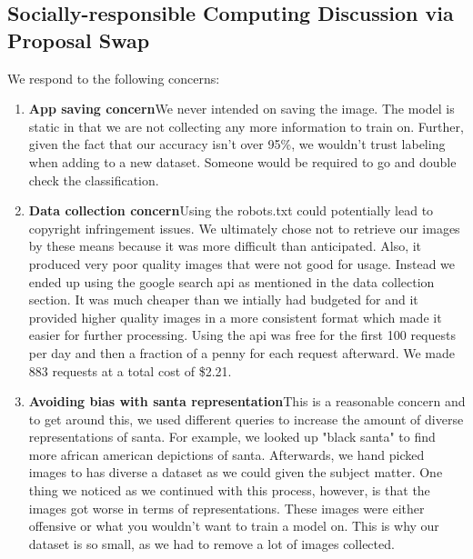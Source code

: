 \subsection{Socially-responsible Computing Discussion via Proposal Swap}

We respond to the following concerns:
\begin{enumerate}
    \item \textbf{App saving concern}\newline We never intended on saving the image. 
    The model is static in that we are not collecting any more information to train on. Further, given the fact 
    that our accuracy isn't over 95\%, we wouldn't trust labeling when adding to a new dataset. Someone would be 
    required to go and double check the classification. 
    \item \textbf{Data collection concern}\newline Using the robots.txt could potentially lead to copyright infringement 
    issues. We ultimately chose not to retrieve our images by these means because it was more difficult than anticipated. 
    Also, it produced very poor quality images that were not good for usage. Instead we ended up using the google search 
    api as mentioned in the data collection section. It was much cheaper than we intially had budgeted for and it provided 
    higher quality images in a more consistent format which made it easier for further processing. Using the api was free 
    for the first 100 requests per day and then a fraction of a penny for each request afterward. We made 883 requests at a 
    total cost of \$2.21.
    \item \textbf{Avoiding bias with santa representation}\newline This is a reasonable concern and to get around this, we used different 
    queries to increase the amount of diverse representations of santa. For example, we looked up "black santa" to find more african 
    american depictions of santa. Afterwards, we hand picked images to has diverse a dataset as we could given the subject matter. One 
    thing we noticed as we continued with this process, however, is that the images got worse in terms of representations. These images 
    were either offensive or what you wouldn't want to train a model on. This is why our dataset is so small, as we had to remove a lot of 
    images collected. 
\end{enumerate}



